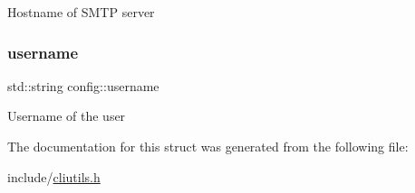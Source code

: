 Hostname of S\+M\+TP server \mbox{\label{structconfig_ac6911ac221a111c05dac0e4288d48401}} 
\subsubsection{\texorpdfstring{username}{username}}
{\footnotesize\ttfamily std\+::string config\+::username}

Username of the user 

The documentation for this struct was generated from the following file\+:\begin{DoxyCompactItemize}
\item 
include/\hyperlink{cliutils_8h}{cliutils.\+h}\end{DoxyCompactItemize}
